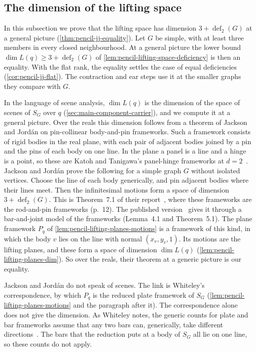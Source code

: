 \subsection{The dimension of the lifting space}
\label{sec:main-component-jj}

In this subsection we prove that the lifting space has dimension
$3 + \operatorname{def}_2(G)$ at a general picture
(\cref{thm:pencil-jj-equality}). Let $G$ be simple, with at least three
members in every closed neighbourhood. At a general picture the lower
bound $\dim L(q) \ge 3 + \operatorname{def}_2(G)$ of
\cref{lem:pencil-lifting-space-deficiency} is then an equality. With the
flat rank, the equality settles the case of equal deficiencies
(\cref{cor:pencil-jj-flat}). The contraction and ear steps use
it at the smaller graphs they compare with $G$.

In the language of scene analysis, $\dim L(q)$ is the dimension of the
space of scenes of $S_G$ over $q$ (\cref{sec:main-component-carrier}),
and we compute it at a general picture. Over the reals this dimension
follows from a theorem of Jackson and Jord\'an on pin-collinear
body-and-pin frameworks. Such a framework consists of rigid bodies in
the real plane, with each pair of adjacent bodies joined by a pin and
the pins of each body on one line. In the plane a panel is a line and a
hinge is a point, so these are Katoh and Tanigawa's panel-hinge
frameworks at $d = 2$~\cite[pp.~648--649]{katohTanigawa2011}. Jackson
and Jord\'an prove the following for a simple graph $G$ without isolated vertices.
Choose the line of each body generically, and pin adjacent bodies where
their lines meet. Then the infinitesimal motions form a space of
dimension $3 + \operatorname{def}_2(G)$. This is Theorem~7.1 of their
report~\cite{jacksonJordan2006pin}, where these frameworks are the
rod-and-pin frameworks (p.~12). The published
version~\cite{jacksonJordan2008pin} gives it through a bar-and-joint
model of the frameworks (Lemma~4.1 and Theorem~5.1). The plane
framework $P_q$ of \cref{lem:pencil-lifting-planes-motions} is a
framework of this kind, in which the body $v$ lies on the line with
normal $(x_v, y_v, 1)$. Its motions are the lifting planes, and these
form a space of dimension
$\dim L(q)$ (\cref{lem:pencil-lifting-planes-dim}). So over the reals,
their theorem at a generic picture is our equality.

Jackson and Jord\'an do not speak of scenes. The link is Whiteley's
correspondence, by which $P_q$ is the reduced plate framework of $S_G$
(\cref{lem:pencil-lifting-planes-motions} and the paragraph after it).
The correspondence alone does not give the dimension. As Whiteley notes,
the generic counts for plate and bar frameworks assume that any two bars
can, generically, take different
directions~\cite[p.~287, Remark~2]{whiteley1984}. The bars that the
reduction puts at a body of $S_G$ all lie on one line, so these counts
do not apply.

